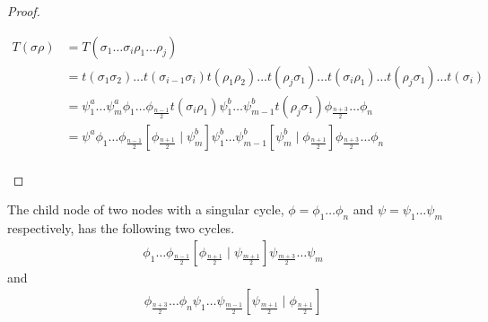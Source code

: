 \begin{proof}
\begin{enumerate}
\begin{align*}
                  T(\sigma\rho) & = T(\sigma_1 \dots \sigma_i \rho_1 \dots \rho_j)                                                                                             \\
                                & =
                  t(\sigma_1\sigma_2) \dots t(\sigma_{i-1}\sigma_i) t(\rho_1\rho_2) \dots t(\rho_j \sigma_1) \dots t(\sigma_i\rho_1) \dots t(\rho_j\sigma_1) \dots t(\sigma_i) \\
                                & =
                  \psi^a_1 \dots \psi^a_m
                  \phi_1 \dots \phi_{\frac{n-1}{2}} t(\sigma_i \rho_1)
                  \psi^b_1 \dots \psi^b_{m-1} t(\rho_j \sigma_1)
                  \phi_{\frac{n+3}{2}} \dots \phi_n                                                                                                                            \\
                                & =
                  \psi^a
                  \phi_1 \dots \phi_{\frac{n-1}{2}} \left[\phi_{\frac{n+1}{2}} \mid \psi^b_m\right]
                  \psi^b_1 \dots \psi^b_{m-1} \left[\psi^b_m \mid \phi_{\frac{n+1}{2}}\right]
                  \phi_{\frac{n+3}{2}} \dots \phi_n                                                                                                                            \\
              \end{align*}
    \end{enumerate}
\end{proof}

\begin{theorem}
    The child node of two nodes with a singular cycle, $\phi = \phi_1 \dots \phi_n$ and $\psi = \psi_1 \dots \psi_m$ respectively, has the following two cycles.
    \begin{align*}
        \phi_1 \dots \phi_{\frac{n-1}{2}} \left[\phi_{\frac{n+1}{2}} \mid \psi_{\frac{m+1}{2}}\right] \psi_{\frac{m+3}{2}} \dots \psi_m
    \end{align*}
    and
    \begin{align*}
        \phi_{\frac{n+3}{2}} \dots \phi_n \psi_1 \dots \psi_{\frac{m-1}{2}} \left[\psi_{\frac{m+1}{2}} \mid \phi_{\frac{n+1}{2}}\right]
    \end{align*}
\end{theorem}


